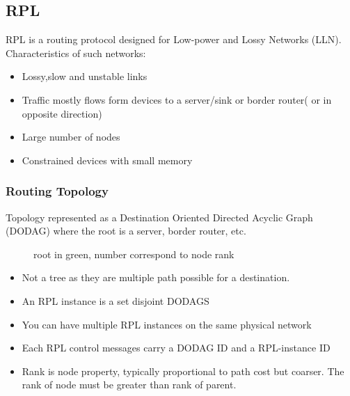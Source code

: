 \subsection{RPL}

RPL is a routing protocol designed for Low-power and Lossy Networks (LLN).
Characteristics of such networks:

\begin{itemize}
    \item Lossy,slow and unstable links
    \item Traffic mostly flows form devices to a server/sink or border
        router( or in opposite direction)
    \item Large number of nodes
    \item Constrained devices with small memory
\end{itemize}

\subsubsection{Routing Topology}

Topology represented as a Destination Oriented Directed Acyclic Graph (DODAG)
where the root is a server, border router, etc.
\begin{figure}[ht!]
    \centering
    \caption{root in green, number correspond to node rank}
\end{figure}
\begin{itemize}
    \item Not a tree as they are multiple path possible for a destination.
    \item An RPL instance is a set disjoint DODAGS
    \item You can have multiple RPL instances on the same physical network
    \item Each RPL control messages carry a DODAG ID and a RPL-instance ID
    \item Rank is node property, typically proportional to path cost but coarser.
        The rank of node must be greater than rank of parent.
\end{itemize}

